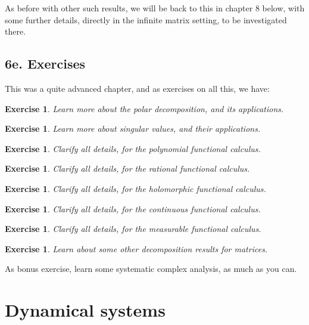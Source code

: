 \documentclass[12pt]{amsbook}
\newtheorem{exercise}[theorem]{Exercise}
\begin{document}
As before with other such results, we will be back to this in chapter 8 below, with some further details, directly in the infinite matrix setting, to be investigated there.

\section*{6e. Exercises}

This was a quite advanced chapter, and as exercises on all this, we have:

\begin{exercise}
Learn more about the polar decomposition, and its applications.
\end{exercise}

\begin{exercise}
Learn more about singular values, and their applications.
\end{exercise}

\begin{exercise}
Clarify all details, for the polynomial functional calculus.
\end{exercise}

\begin{exercise}
Clarify all details, for the rational functional calculus.
\end{exercise}

\begin{exercise}
Clarify all details, for the holomorphic functional calculus.
\end{exercise}

\begin{exercise}
Clarify all details, for the continuous functional calculus.
\end{exercise}

\begin{exercise}
Clarify all details, for the measurable functional calculus.
\end{exercise}

\begin{exercise}
Learn about some other decomposition results for matrices.
\end{exercise}

As bonus exercise, learn some systematic complex analysis, as much as you can.

\chapter{Dynamical systems}
\end{document}
